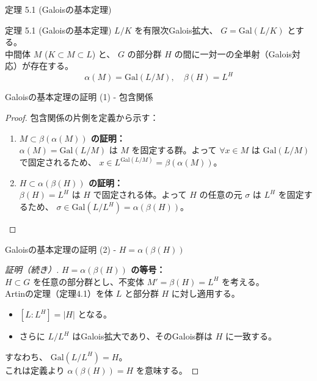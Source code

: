 \documentclass[aspectratio=169,11pt,unicode]{beamer}
\begin{document}
\begin{frame}{定理 5.1 (Galoisの基本定理)}
\begin{block}{定理 5.1 (Galoisの基本定理)}
$L/K$ を有限次Galois拡大、 $G = \mathrm{Gal}(L/K)$ とする。\\
中間体 $M$ ($K \subset M \subset L$) と、 $G$ の部分群 $H$ の間に一対一の全単射（Galois対応）が存在する。
\[ \alpha(M) = \mathrm{Gal}(L/M), \quad \beta(H) = L^H \]
\end{block}
\end{frame}

\begin{frame}{Galoisの基本定理の証明 (1) - 包含関係}
\begin{proof}
包含関係の片側を定義から示す：
\begin{enumerate}
    \item \textbf{$M \subset \beta(\alpha(M))$ の証明：}\\
    $\alpha(M) = \mathrm{Gal}(L/M)$ は $M$ を固定する群。よって $\forall x \in M$ は $\mathrm{Gal}(L/M)$ で固定されるため、 $x \in L^{\mathrm{Gal}(L/M)} = \beta(\alpha(M))$。
    \item \textbf{$H \subset \alpha(\beta(H))$ の証明：}\\
    $\beta(H) = L^H$ は $H$ で固定される体。よって $H$ の任意の元 $\sigma$ は $L^H$ を固定するため、 $\sigma \in \mathrm{Gal}(L/L^H) = \alpha(\beta(H))$。
\end{enumerate}
\end{proof}
\end{frame}

\begin{frame}{Galoisの基本定理の証明 (2) - $H = \alpha(\beta(H))$}
\begin{proof}[証明（続き）]
\textbf{$H = \alpha(\beta(H))$ の等号：}\\
$H \subset G$ を任意の部分群とし、不変体 $M' = \beta(H) = L^H$ を考える。\\
\vspace{0.2cm}
Artinの定理（定理4.1）を体 $L$ と部分群 $H$ に対し適用する。
\begin{itemize}
    \item $[L : L^H] = |H|$ となる。
    \item さらに $L/L^H$ はGalois拡大であり、そのGalois群は $H$ に一致する。
\end{itemize}
\vspace{0.2cm}
すなわち、 $\mathrm{Gal}(L/L^H) = H$。\\
これは定義より $\alpha(\beta(H)) = H$ を意味する。
\end{proof}
\end{frame}
\end{document}
